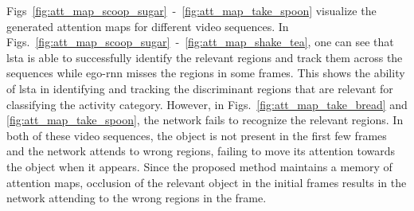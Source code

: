 \documentclass[10pt,twocolumn,letterpaper]{article}
\begin{document}
\begin{matrix*}[r]
Figs~\ref{fig:att_map_scoop_sugar}~-~\ref{fig:att_map_take_spoon} visualize the generated attention maps for different video sequences. In Figs.~\ref{fig:att_map_scoop_sugar}~-~\ref{fig:att_map_shake_tea}, one can see that \acs{lsta} is able to successfully identify the relevant regions and track them across the sequences while ego-rnn misses the regions in some frames. This shows the ability of \acs{lsta} in identifying and tracking the discriminant regions that are relevant for classifying the activity category. However, in Figs.~\ref{fig:att_map_take_bread} and \ref{fig:att_map_take_spoon}, the network fails to recognize the relevant regions. In both of these video sequences, the object is not present in the first few frames and the network attends to wrong regions, failing to move its attention towards the object when it appears. Since the proposed method maintains a memory of attention maps, occlusion of the relevant object in the initial frames results in the network attending to the wrong regions in the frame.
	

\end{matrix*}
\end{document}
